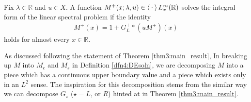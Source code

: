 \documentclass[../dissertation.tex]{subfiles}
\begin{document}
\begin{defn}\label{dfn4:IEsoln}
	Fix $\lambda \in \mathbb R$ and $u\in X$. A function 
	$M^+(x; \lambda, u) \in \left\langle \kern 0.5ex \cdot \kern 0.5ex \right\rangle L_x^\infty(\mathbb R)$ 
	solves the integral form of the linear spectral problem if the identity
	\begin{align}\label{eq4:MPluseq}
		M^+(x) = 1 + G_L^+*(uM^+)(x)
	\end{align}
	holds for almost every $x\in \mathbb R$.
\end{defn}

As discussed following the statement of Theorem \ref{thm3:main_result}, 
In breaking up $M$ into $M_c$ and $M_s$ in Definition \ref{dfn4:DEsoln}, we 
are decomposing $M$ into a piece which has a continuous upper boundary value and a
piece which exists only in an $L^2$ sense. The inspiration for this decomposition
stems from the similar way we can decompose $G_\star$ ($\star = L \text{, or } R$)
hinted at in Theorem \ref{thm3:main_result}.

 

\end{document}
